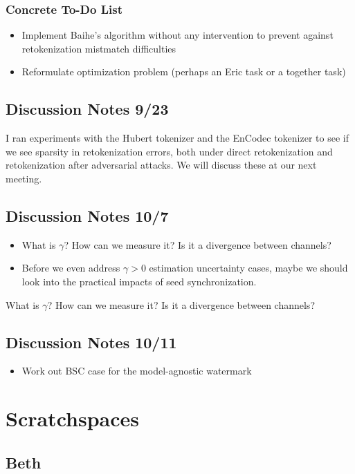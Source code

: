 \documentclass[12pt]{article}
\theoremstyle{plain}
\theoremstyle{definition}
\begin{document}
\subsubsection{Concrete To-Do List}
\begin{itemize}
    \item Implement Baihe's algorithm without any intervention to prevent against retokenization mistmatch difficulties
    \item Reformulate optimization problem (perhaps an Eric task or a together task)
\end{itemize}


\subsection{Discussion Notes 9/23}
I ran experiments with the Hubert tokenizer and the EnCodec tokenizer to see if we see sparsity in retokenization errors, both under direct retokenization and retokenization after adversarial attacks. We will discuss these at our next meeting. 

\subsection{Discussion Notes 10/7}
\begin{itemize}
    \item What is $\gamma$? How can we measure it? Is it a divergence between channels?
    \item Before we even address $\gamma>0$ estimation uncertainty cases, maybe we should look into the practical impacts of seed synchronization.
\end{itemize}
What is $\gamma$? How can we measure it? Is it a divergence between channels?


\subsection{Discussion Notes 10/11}
\begin{itemize}
    \item Work out BSC case for the model-agnostic watermark
\end{itemize}



\section{Scratchspaces}
\subsection{Beth}
\end{document}
